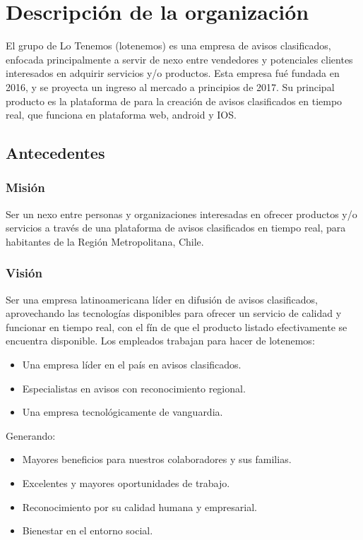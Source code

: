 \documentclass[letterpaper,openright,10pt,oneside]{report}
\begin{document}
		\section{Descripción de la organización}
		El grupo de Lo Tenemos (lotenemos) es una empresa de avisos clasificados, enfocada principalmente a servir de nexo entre vendedores y potenciales clientes interesados en adquirir servicios y/o productos. Esta empresa fué fundada en 2016, y se proyecta un ingreso al mercado a principios de 2017.
		Su principal producto es la plataforma de para la creación de avisos clasificados en tiempo real, que funciona en plataforma web, android y IOS.
			\subsection{Antecedentes}
				\subsubsection{Misión}
					Ser un nexo entre personas y organizaciones interesadas en ofrecer productos y/o servicios a través de una plataforma de avisos clasificados en tiempo real, para habitantes de la Región Metropolitana, Chile.
				\subsubsection{Visión}
				Ser una empresa latinoamericana líder en difusión de avisos clasificados, aprovechando las tecnologías disponibles para ofrecer un servicio de calidad y funcionar en tiempo real, con el fín de que el producto listado efectivamente se encuentra disponible.
					Los empleados trabajan para hacer de lotenemos:
						\begin{itemize}
							\item Una empresa líder en el país en avisos clasificados.
							\item Especialistas en avisos con reconocimiento regional.
							\item Una empresa tecnológicamente de vanguardia.
\end{itemize}
			Generando:
			\begin{itemize}
				\item Mayores beneficios para nuestros colaboradores y sus familias.
				\item Excelentes y mayores oportunidades de trabajo.
				\item Reconocimiento por su calidad humana y empresarial.
				\item Bienestar en el entorno social.
\end{itemize}
\end{document}
